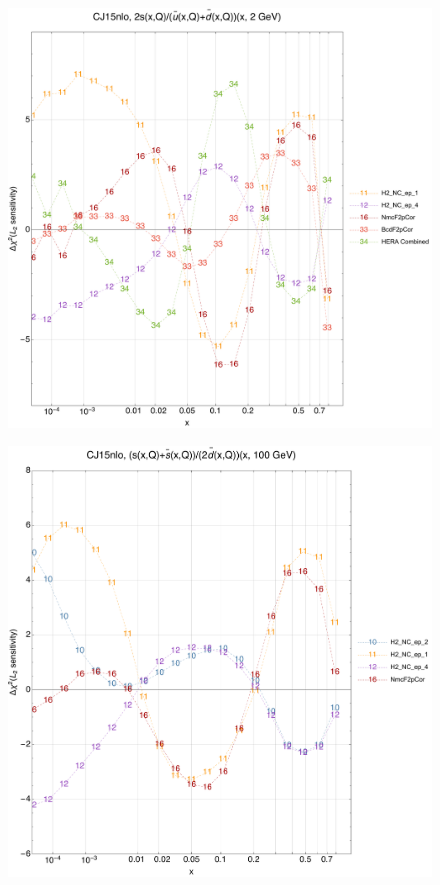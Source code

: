 \documentclass[10pt,aps,prd,floatfix,titlepage]{revtex4}
\begin{document}
\begin{figure}
\includegraphics[width=\textwidth,height=0.44\textheight,keepaspectratio]{2/rat_ifl5_CJ15nlo_L2_q2_Sf_2.pdf}
\caption{}
\end{figure}
\clearpage
\begin{figure}
\includegraphics[width=\textwidth,height=0.44\textheight,keepaspectratio]{2/rat_ifl6_CJ15nlo_L2_q100_Sf_2.pdf}
\caption{}
\end{figure}
\end{document}
